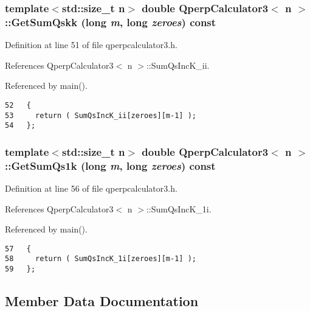\subsubsection{\setlength{\rightskip}{0pt plus 5cm}template$<$std::size\_\-t n$>$ double {\bf QperpCalculator3}$<$ n $>$::GetSumQskk (long {\em m}, long {\em zeroes}) const\hspace{0.3cm}{\tt  [inline]}}\label{classQperpCalculator3_f70b86cf138b434ce2be08ad219178ce}




Definition at line 51 of file qperpcalculator3.h.

References QperpCalculator3$<$ n $>$::SumQsIncK\_\-ii.

Referenced by main().

\begin{Code}\begin{verbatim}52   {
53     return ( SumQsIncK_ii[zeroes][m-1] );
54   };
\end{verbatim}
\end{Code}


\subsubsection{\setlength{\rightskip}{0pt plus 5cm}template$<$std::size\_\-t n$>$ double {\bf QperpCalculator3}$<$ n $>$::GetSumQs1k (long {\em m}, long {\em zeroes}) const\hspace{0.3cm}{\tt  [inline]}}\label{classQperpCalculator3_91c5081765b9951220aa17eeea8a01cb}




Definition at line 56 of file qperpcalculator3.h.

References QperpCalculator3$<$ n $>$::SumQsIncK\_\-1i.

Referenced by main().

\begin{Code}\begin{verbatim}57   {
58     return ( SumQsIncK_1i[zeroes][m-1] );
59   };
\end{verbatim}
\end{Code}




\subsection{Member Data Documentation}
